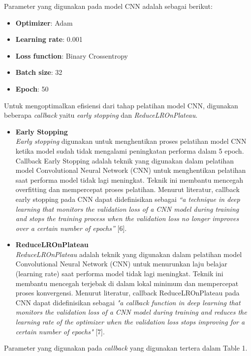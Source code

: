 \documentclass[conference]{IEEEtran}
\begin{document}
Parameter yang digunakan pada model CNN adalah sebagai berikut:
\begin{itemize}
    \item \textbf{Optimizer}: Adam
    \item \textbf{Learning rate}: 0.001
    \item \textbf{Loss function}: Binary Crossentropy
    \item \textbf{Batch size}: 32
    \item \textbf{Epoch}: 50
\end{itemize}
Untuk mengoptimalkan efisiensi dari tahap pelatihan model CNN, digunakan beberapa \textit{callback} yaitu \textit{early stopping} dan \textit{ReduceLROnPlateau}. 

\begin{itemize}
    \item \textbf{Early Stopping} \\
    \textit{Early stopping} digunakan untuk menghentikan proses pelatihan model CNN ketika model sudah tidak mengalami peningkatan performa dalam 5 epoch. Callback Early Stopping adalah teknik yang digunakan dalam pelatihan model Convolutional Neural Network (CNN) untuk menghentikan pelatihan saat performa model tidak lagi meningkat. Teknik ini membantu mencegah overfitting dan mempercepat proses pelatihan. Menurut literatur, callback early stopping pada CNN dapat didefinisikan sebagai \textit{``a technique in deep learning that monitors the validation loss of a CNN model during training and stops the training process when the validation loss no longer improves over a certain number of epochs''} [6].\\

    \item \textbf{ReduceLROnPlateau} \\
    \textit{ReduceLROnPlateau} adalah teknik yang digunakan dalam pelatihan model Convolutional Neural Network (CNN) untuk menurunkan laju belajar (learning rate) saat performa model tidak lagi meningkat. Teknik ini membantu mencegah terjebak di dalam lokal minimum dan mempercepat proses konvergensi. Menurut literatur, callback ReduceLROnPlateau pada CNN dapat didefinisikan sebagai \textit{"a callback function in deep learning that monitors the validation loss of a CNN model during training and reduces the learning rate of the optimizer when the validation loss stops improving for a certain number of epochs"} [7].
\end{itemize}
Parameter yang digunakan pada \textit{callback} yang digunakan tertera dalam Table 1.
\end{document}
